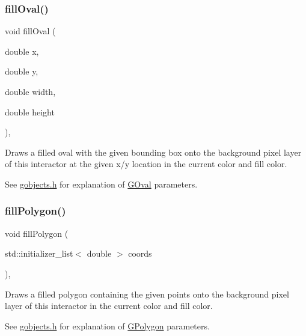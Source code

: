\subsubsection{\texorpdfstring{fill\+Oval()}{fillOval()}\hspace{0.1cm}{\footnotesize\ttfamily [2/2]}}
{\footnotesize\ttfamily void fill\+Oval (\begin{DoxyParamCaption}\item[{double}]{x,  }\item[{double}]{y,  }\item[{double}]{width,  }\item[{double}]{height }\end{DoxyParamCaption})\hspace{0.3cm}{\ttfamily [virtual]}, {\ttfamily [inherited]}}



Draws a filled oval with the given bounding box onto the background pixel layer of this interactor at the given x/y location in the current color and fill color. 

See \mbox{\hyperlink{gobjects_8h_source}{gobjects.\+h}} for explanation of \mbox{\hyperlink{classsgl_1_1GOval}{G\+Oval}} parameters. \mbox{\label{classsgl_1_1GDrawingSurface_a15f8c1c4409ef51c1a30a92a195b8f66}} 
\subsubsection{\texorpdfstring{fill\+Polygon()}{fillPolygon()}\hspace{0.1cm}{\footnotesize\ttfamily [1/2]}}
{\footnotesize\ttfamily void fill\+Polygon (\begin{DoxyParamCaption}\item[{std\+::initializer\+\_\+list$<$ double $>$}]{coords }\end{DoxyParamCaption})\hspace{0.3cm}{\ttfamily [virtual]}, {\ttfamily [inherited]}}



Draws a filled polygon containing the given points onto the background pixel layer of this interactor in the current color and fill color. 

See \mbox{\hyperlink{gobjects_8h_source}{gobjects.\+h}} for explanation of \mbox{\hyperlink{classsgl_1_1GPolygon}{G\+Polygon}} parameters. \mbox{\label{classsgl_1_1GDrawingSurface_a31822d59786156ebf1cc3b2f7fb70330}} 
